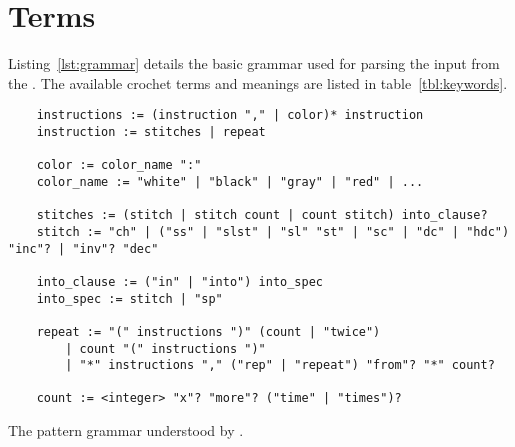 \documentclass[main.tex]{subfiles}
\begin{document}
\section{Terms}\label{sec:terms}

Listing~\ref{lst:grammar} details the basic grammar used for parsing the input from the \PTI. The available crochet terms and meanings are listed in table~\ref{tbl:keywords}.

\begin{listing}[htbp]
    \centering
    \begin{verbatim}
    instructions := (instruction "," | color)* instruction
    instruction := stitches | repeat

    color := color_name ":"
    color_name := "white" | "black" | "gray" | "red" | ...

    stitches := (stitch | stitch count | count stitch) into_clause?
    stitch := "ch" | ("ss" | "slst" | "sl" "st" | "sc" | "dc" | "hdc") "inc"? | "inv"? "dec"

    into_clause := ("in" | "into") into_spec
    into_spec := stitch | "sp"

    repeat := "(" instructions ")" (count | "twice")
        | count "(" instructions ")"
        | "*" instructions "," ("rep" | "repeat") "from"? "*" count?

    count := <integer> "x"? "more"? ("time" | "times")?
    \end{verbatim}
    \caption{The pattern grammar understood by \CC.}
    \label{lst:grammar}
\end{listing}
\end{document}
